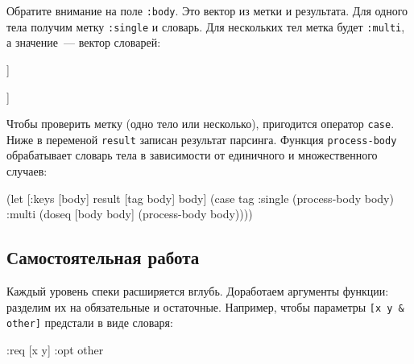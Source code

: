 \fi

Обратите внимание на поле \verb|:body|. Это вектор из метки и результата. Для
одного тела получим метку \verb|:single| и словарь. Для нескольких тел метка
будет \verb|:multi|, а значение~--- вектор словарей:

\ifx\DEVICETYPE\MOBILE

\begin{english}
  \begin{clojure}
[:multi [{:args [x]
          :code [(println 1)]}
         {:args [x y]
          :code [(println 2)]}]]
  \end{clojure}
\end{english}

\else

\begin{english}
  \begin{clojure}
[:multi [{:args [x] :code [(println 1)]}
         {:args [x y] :code [(println 2)]}]]
  \end{clojure}
\end{english}

\fi

Чтобы проверить метку (одно тело или несколько), пригодится оператор
\verb|case|. Ниже в переменой \verb|result| записан результат парсинга. Функция
\verb|process-body| обрабатывает словарь тела в зависимости от единичного и
множественного случаев:

\begin{english}
  \begin{clojure}
(let [{:keys [body]} result
      [tag body] body]
  (case tag
    :single
    (process-body body)
    :multi
    (doseq [body body]
      (process-body body))))
  \end{clojure}
\end{english}

\subsection{Самостоятельная работа}


Каждый уровень спеки расширяется вглубь. Доработаем аргументы функции: разделим
их на обязательные и остаточные. Например, чтобы параметры \verb|[x y & other]|
предстали в виде словаря:

\begin{english}
  \begin{clojure}
{:req [x y] :opt other}
  \end{clojure}
\end{english}

